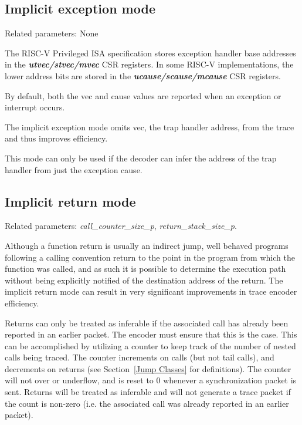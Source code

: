 \subsection{Implicit exception mode} \label{sec:implicit-exception}

Related parameters: None

The RISC-V Privileged ISA specification stores exception handler base
addresses in the \textbf{\textit{utvec/stvec/mvec}} CSR registers.
In some RISC-V implementations, the lower address bits are stored in
the \textbf{\textit{ucause/scause/mcause}} CSR registers.

By default, both the vec and cause values are reported when an exception or interrupt occurs.

The implicit exception mode omits vec, the trap handler address, from the trace and
thus improves efficiency.

This mode can only be used if the decoder can infer the address of the trap handler
from just the exception cause.

\subsection{Implicit return mode} \label{sec:implicit-return}

Related parameters: \textit{call\_counter\_size\_p}, \textit{return\_stack\_size\_p}.

Although a function return is usually an indirect jump, well behaved programs following a 
calling convention return to the point in the program from which the function was called, 
and as such it is possible to determine the execution path without being explicitly notified 
of the destination address of the return.  The implicit return mode can result in very
significant improvements in trace encoder efficiency.

Returns can only be treated as inferable if the associated call has already been reported in
an earlier packet.  The encoder must ensure that this is the case.  This can be accomplished
by utilizing a counter to keep track of the number of nested calls being traced.  The counter
increments on calls (but not tail calls), and decrements on returns (see Section~\ref{Jump Classes}
for definitions).  The counter will not over or underflow, and is reset to 0 whenever a
synchronization packet is sent.  Returns will be treated as inferable and will not generate a trace
packet if the count is non-zero (i.e. the associated call was already reported in an earlier packet).

